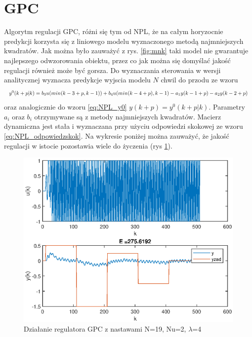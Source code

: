 	\section{GPC}
		\label{sec:GPC}
		Algorytm regulacji GPC, różni się tym od NPL, że na całym horyzocnie predykcji korzysta się z liniowego modelu wyznaczonego metodą najmniejszych kwadratów. Jak można było zauważyć z rys. \ref{fig:mnk} taki model nie gwarantuje najlepszego odwzorowania obiektu, przez co jak można się domyślać jakość regulacji również może być gorsza.
		Do wyznaczania sterowania w wersji analitycznej wyznacza predykcje wyjscia modelu $N$ chwil do przodu ze wzoru
		\begin{equation}
		\begin{tabular}{l}
		$y^0(k+p|k)=b_3u(min(k-3+p,k-1))+b_4u(min(k-4+p),k-1)-a_1y(k-1+p)-a_2y(k-2+p)$
		\end{tabular}
		\label{eq:GPC_y0}
		\end{equation}
		oraz analogicznie do wzoru \ref{eq:NPL_y0} $y(k+p)=y^0(k+p|k)$. Parametry $a_i$ oraz $b_i$ otrzymywane są z metody najmniejszych kwadratów. Macierz dynamiczna jest stała i wyznaczana przy użyciu odpowiedzi skokowej ze wzoru \ref{eq:NPL_odpowiedzskok}. Na wykresie poniżej można zauważyć, że jakość regulacji w istocie pozostawia wiele do życzenia (rys \ref{fig:GPC}).
		
		\begin{figure}[h!]
			\centering
			\includegraphics[width=\linewidth]{img/strojenieGPC_N_19_Nu_2_lam_4.eps}
			\caption{Działanie regulatora GPC z nastawami N=19, Nu=2, $\lambda$=4}
			\label{fig:GPC}
		\end{figure}
	
